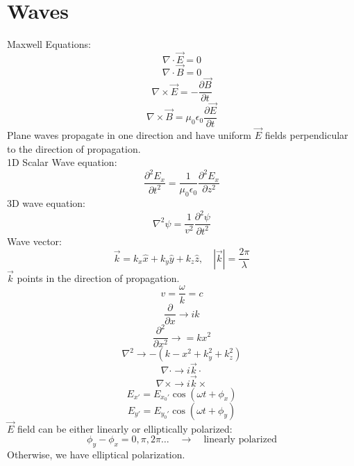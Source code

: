 \documentclass[12pt]{article}
\begin{document}
\section{Waves}
\noindent Maxwell Equations:
\begin{equation}
    \nabla\cdot \vec{E}=0
\end{equation}
\begin{equation}
    \nabla\cdot \vec{B}=0
\end{equation}
\begin{equation}
    \nabla\times \vec{E}=-\frac{\partial\vec{B}}{\partial t}
\end{equation}
\begin{equation}
    \nabla\times \vec{B}=\mu_0\epsilon_0\frac{\partial\vec{E}}{\partial t}
\end{equation}
Plane waves propagate in one direction and have uniform $\vec{E}$ fields perpendicular to the direction of propagation.\\
1D Scalar Wave equation:
\[\frac{\partial^2 E_x}{\partial t^2}=\frac{1}{\mu_0\epsilon_0}\frac{\partial^2 E_x}{\partial z^2}\]
3D wave equation:
\[  \nabla^2\psi=\frac{1}{v^2}\frac{\partial^2\psi}{\partial t^2}\]
Wave vector: \[\vec{k}=k_x\hat{x}+k_y\hat{y}+k_z\hat{z},\quad \left\vert\vec{k}\right\vert = \frac{2\pi}{\lambda}\]
$\vec{k}$ points in the direction of propagation.
\[v=\frac{\omega}{k}=c\]
\[\frac{\partial}{\partial x} \rightarrow ik\]
\[\frac{\partial^2}{\partial x^2}\rightarrow =kx^2\]
\[\nabla^2\rightarrow -\left( k-x^2+k_y^2+k_z^2  \right)\]
\[\nabla\cdot \rightarrow i\vec{k}\cdot\]
\[\nabla\times \rightarrow i\vec{k}\times \]
\[E_{x'}=E_{x_0'}\cos(\omega t +\phi_x)\]
\[E_{y'}=E_{y_0'}\cos(\omega t +\phi_y)\]
$\vec{E}$ field can be either linearly or elliptically polarized:
\[\phi_y-\phi_x=0,\pi,2\pi\dots\quad \rightarrow\quad \text{linearly polarized}\]
Otherwise, we have elliptical polarization. 
\end{document}
